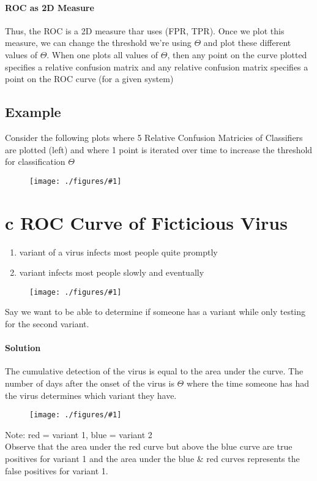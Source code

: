 \documentclass[12pt]{book}
\newcommand{\incimg}[2]{%
       \begin{figure}[h]
               \centering
               \texttt{[image: ./figures/\#1]}
       \end{figure}
}
\begin{document}
\paragraph{ROC as 2D Measure}
Thus, the ROC is a 2D measure thar uses (FPR, TPR).
Once we plot this measure, we can change the threshold we're using $\Theta$ and plot these
different values of $\Theta$.
When one plots all values of $\Theta$, then any point on the curve plotted specifies a relative 
confusion matrix and any relative confusion matrix specifies a point on the ROC curve (for a 
given system)

\subsection*{Example}
Consider the following plots where 5 Relative Confusion Matricies of Classifiers are plotted
(left) and where 1 point is iterated over time to increase the threshold for classification
$\Theta$
\incimg{ROCex}{0.5}

\section*{c ROC Curve of Ficticious Virus}
\begin{enumerate}
        \item variant of a virus infects most people quite promptly
        \item variant infects most people slowly and eventually
\end{enumerate}
\incimg{variants}{0.8}

Say we want to be able to determine if someone has a variant while only testing
for the second variant.
\pagebreak

\paragraph{Solution}
The cumulative detection of the virus is equal to the area under the curve. The number of
days after the onset of the virus is $\Theta$ where the time someone has had the virus determines
which variant they have.

\incimg{AUC}{0.7}

Note: red = variant 1, blue = variant 2\\
Observe that the area under the red curve but above the blue curve are true positives for
variant 1 and the area under the blue \& red curves represents the false positives for variant 1.
\end{document}

